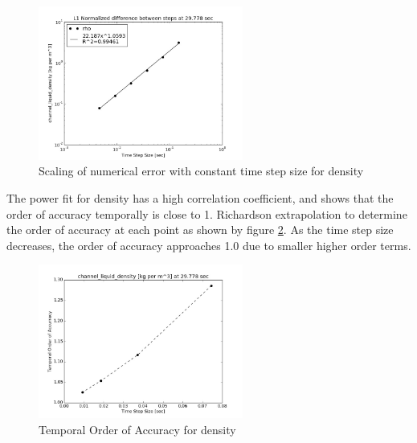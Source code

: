     
    \begin{figure}[!h]
    	\centering
    	\includegraphics[width=0.60\textwidth]{images/Isokinetic_Advection/Difference_rho}
    	\caption{Scaling of numerical error with constant time step size for
    	density}
    	\label{fig:Difference_rho}
    \end{figure}
    
    The power fit for density has a high correlation coefficient, and
    shows that the order of accuracy temporally is close to 1. Richardson
    extrapolation to determine the order of accuracy at each point as shown by 
    figure \ref{fig:Temporal_Order_Of_Accuracy_rho}. As the time step size
    decreases, the order of accuracy approaches 1.0 due to smaller higher order
    terms. 
        
    
    \begin{figure}[!h]
    	\centering
    	\includegraphics[width=0.60\textwidth]{images/Isokinetic_Advection/Temoral_Order_Of_Accuracy_rho}
    	\caption{Temporal Order of Accuracy for density}
    	\label{fig:Temporal_Order_Of_Accuracy_rho}
    \end{figure}
    
